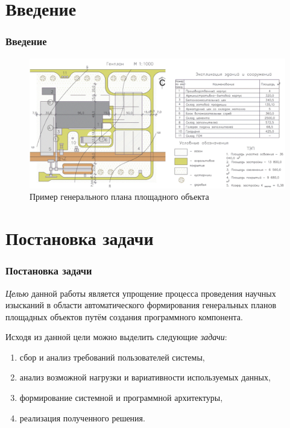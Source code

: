 \section{Введение}

\begin{frame}
\frametitle{Введение}
\begin{figure}
    \includegraphics[scale=.5]{pictures/common/site_plan}
    \caption{Пример генерального плана площадного объекта}
\end{figure}
\end{frame}


\section{Постановка задачи}

\begin{frame}
\frametitle{Постановка задачи}
\textit{\textcolor{ITMOred}{Целью}} данной работы является упрощение процесса проведения научных изысканий
в области автоматического формирования генеральных планов площадных объектов
путём создания программного компонента.
\vskip 5mm

Исходя из данной цели можно выделить следующие \textit{\textcolor{ITMOred}{задачи}}:
\begin{enumerate}
    \item сбор и анализ требований пользователей системы,
    \item анализ возможной нагрузки и вариативности используемых данных,
    \item формирование системной и программной архитектуры,
    \item реализация полученного решения.
\end{enumerate}
\end{frame}
